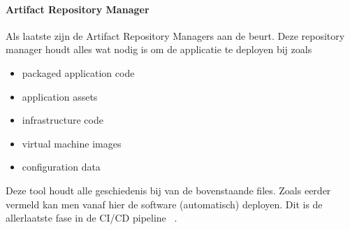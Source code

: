         \paragraph{Artifact Repository Manager}
        Als laatste zijn de Artifact Repository Managers aan de beurt. Deze repository manager houdt alles wat nodig is om de applicatie te deployen bij zoals
        \begin{itemize}
            \item packaged application code
            \item application assets
            \item infrastructure code
            \item virtual machine images
            \item configuration data
        \end{itemize}
        Deze tool houdt alle geschiedenis bij van de bovenstaande files. Zoals eerder vermeld kan men vanaf hier de software (automatisch) deployen. Dit is de allerlaatste fase in de CI/CD pipeline ~\autocite{Skelton2014}.